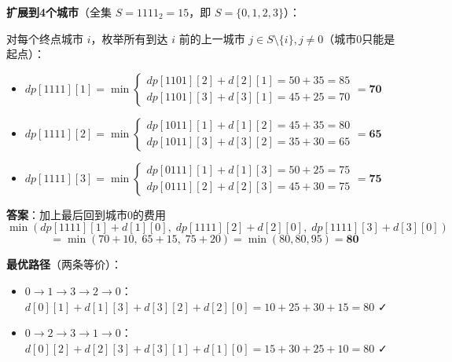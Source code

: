 \documentclass[12pt, a4paper]{ctexart}
\begin{document}
\begin{blackboard}

\textbf{扩展到4个城市}（全集 $S = 1111_2 = 15$，即 $S=\{0,1,2,3\}$）：

对每个终点城市 $i$，枚举所有到达 $i$ 前的上一城市 $j \in S\setminus\{i\}, j \neq 0$（城市0只能是起点）：

\begin{itemize}
    \item $dp[1111][1] = \min\begin{cases} dp[1101][2] + d[2][1] = 50 + 35 = 85 \\ dp[1101][3] + d[3][1] = 45 + 25 = 70 \end{cases} = \mathbf{70}$
    \item $dp[1111][2] = \min\begin{cases} dp[1011][1] + d[1][2] = 45 + 35 = 80 \\ dp[1011][3] + d[3][2] = 35 + 30 = 65 \end{cases} = \mathbf{65}$
    \item $dp[1111][3] = \min\begin{cases} dp[0111][1] + d[1][3] = 50 + 25 = 75 \\ dp[0111][2] + d[2][3] = 45 + 30 = 75 \end{cases} = \mathbf{75}$
\end{itemize}

\textbf{答案}：加上最后回到城市0的费用
\[
\min(dp[1111][1] + d[1][0],\; dp[1111][2] + d[2][0],\; dp[1111][3] + d[3][0])
\]\[= \min(70 + 10,\; 65 + 15,\; 75 + 20) = \min(80, 80, 95) = \mathbf{80}
\]

\textbf{最优路径}（两条等价）：
\begin{itemize}
    \item $0 \to 1 \to 3 \to 2 \to 0$：$d[0][1]+d[1][3]+d[3][2]+d[2][0]=10+25+30+15=80$ ✓
    \item $0 \to 2 \to 3 \to 1 \to 0$：$d[0][2]+d[2][3]+d[3][1]+d[1][0]=15+30+25+10=80$ ✓
\end{itemize}

\end{blackboard}
\end{document}
